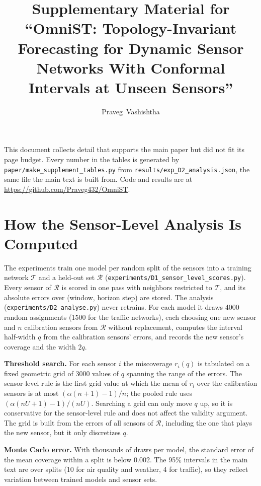 \documentclass[journal,onecolumn]{IEEEtran}
\begin{document}
\title{Supplementary Material for ``OmniST: Topology-Invariant Forecasting for Dynamic Sensor
Networks With Conformal Intervals at Unseen Sensors''}
\author{Praveg~Vashishtha}
\maketitle

This document collects detail that supports the main paper but did not fit its page budget. Every
number in the tables is generated by \texttt{paper/make\_supplement\_tables.py} from
\texttt{results/exp\_D2\_analysis.json}, the same file the main text is built from. Code and results are
at \url{https://github.com/Praveg432/OmniST}.

\section{How the Sensor-Level Analysis Is Computed}
The experiments train one model per random split of the sensors into a training network
$\mathcal{T}$ and a held-out set $\mathcal{R}$ (\texttt{experiments/D1\_sensor\_level\_scores.py}).
Every sensor of $\mathcal{R}$ is scored in one pass with neighbors restricted to $\mathcal{T}$, and
its absolute errors over (window, horizon step) are stored. The analysis
(\texttt{experiments/D2\_analyse.py}) never retrains. For each model it draws 4000 random
assignments (1500 for the traffic networks), each choosing one new sensor and $n$ calibration sensors
from $\mathcal{R}$ without replacement, computes the interval half-width $q$ from the calibration
sensors' errors, and records the new sensor's coverage and the width $2q$.

\textbf{Threshold search.} For each sensor $i$ the miscoverage $r_i(q)$ is tabulated on a fixed
geometric grid of 3000 values of $q$ spanning the range of the errors. The sensor-level rule is the
first grid value at which the mean of $r_i$ over the calibration sensors is at most
$(\alpha(n+1)-1)/n$; the pooled rule uses $(\alpha(nU+1)-1)/(nU)$. Searching a grid can only move $q$
up, so it is conservative for the sensor-level rule and does not affect the validity argument. The
grid is built from the errors of all sensors of $\mathcal{R}$, including the one that plays the new
sensor, but it only discretizes $q$.

\textbf{Monte Carlo error.} With thousands of draws per model, the standard error of the mean coverage
within a split is below 0.002. The 95\% intervals in the main text are over splits (10 for air quality
and weather, 4 for traffic), so they reflect variation between trained models and sensor sets.
\end{document}
